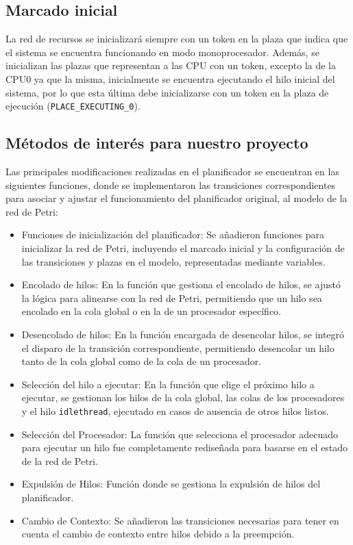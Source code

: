 \subsection{Marcado inicial}
La red de recursos se inicializará siempre con un token en la plaza que indica que el sistema se encuentra funcionando en modo monoprocesador. Además, se inicializan las plazas que representan a las CPU con un token, excepto la de la CPU0 ya que la misma, inicialmente se encuentra ejecutando el hilo inicial del sistema, por lo que esta última debe inicializarse con un token en la plaza de ejecución (\verb|PLACE_EXECUTING_0|).



\subsection{Métodos de interés para nuestro proyecto}

Las principales modificaciones realizadas en el planificador se encuentran en las siguientes funciones, donde se implementaron las transiciones correspondientes para asociar y ajustar el funcionamiento del planificador original, al modelo de la red de Petri:

\begin{itemize}
    \item Funciones de inicialización del planificador: Se añadieron funciones para inicializar la red de Petri, incluyendo el marcado inicial y la configuración de las transiciones y plazas en el modelo, representadas mediante variables.
    \item Encolado de hilos: En la función que gestiona el encolado de hilos, se ajustó la lógica para alinearse con la red de Petri, permitiendo que un hilo sea encolado en la cola global o en la de un procesador específico.
    \item Desencolado de hilos: En la función encargada de desencolar hilos, se integró el disparo de la transición correspondiente, permitiendo desencolar un hilo tanto de la cola global como de la cola de un procesador.
    \item Selección del hilo a ejecutar: En la función que elige el próximo hilo a ejecutar, se gestionan los hilos de la cola global, las colas de los procesadores y el hilo \texttt{idlethread}, ejecutado en casos de ausencia de otros hilos listos.
    \item Selección del Procesador: La función que selecciona el procesador adecuado para ejecutar un hilo fue completamente rediseñada para basarse en el estado de la red de Petri.
    \item Expulsión de Hilos: Función donde se gestiona la expulsión de hilos del planificador.
    \item Cambio de Contexto: Se añadieron las transiciones necesarias para tener en cuenta el cambio de contexto entre hilos debido a la preempción.
\end{itemize}
